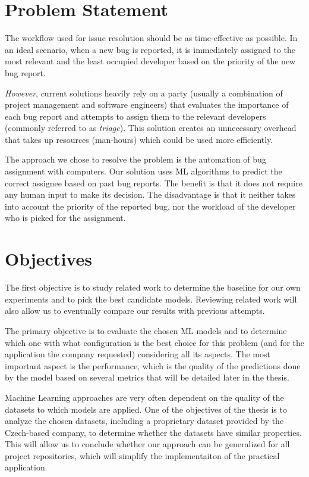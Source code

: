\section{Problem Statement}

The workflow used for issue resolution should be as time-effective as possible. In an ideal scenario, when a new bug is reported, it is immediately assigned to the most relevant and the least occupied developer based on the priority of the new bug report.

\textit{However}, current solutions heavily rely on a party (usually a combination of project management and software engineers) that evaluates the importance of each bug report and attempts to assign them to the relevant developers (commonly referred to as \textit{triage}). This solution creates an unnecessary overhead that takes up resources (man-hours) which could be used more efficiently.

The approach we chose to resolve the problem is the automation of bug assignment with computers. Our solution uses ML algorithms to predict the correct assignee based on past bug reports. The benefit is that it does not require any human input to make its decision. The disadvantage is that it neither takes into account the priority of the reported bug, nor the workload of the developer who is picked for the assignment.

\section{Objectives}

The first objective is to study related work to determine the baseline for our own experiments and to pick the best candidate models. Reviewing related work will also allow us to eventually compare our results with previous attempts.

The primary objective is to evaluate the chosen ML models and to determine which one with what configuration is the best choice for this problem (and for the application the company requested) considering all its aspects. The most important aspect is the performance, which is the quality of the predictions done by the model based on several metrics that will be detailed later in the thesis.

Machine Learning approaches are very often dependent on the quality of the datasets to which models are applied. One of the objectives of the thesis is to analyze the chosen datasets, including a proprietary dataset provided by the Czech-based company, to determine whether the datasets have similar properties. This will allow us to conclude whether our approach can be generalized for all project repositories, which will simplify the implementaiton of the practical application.

